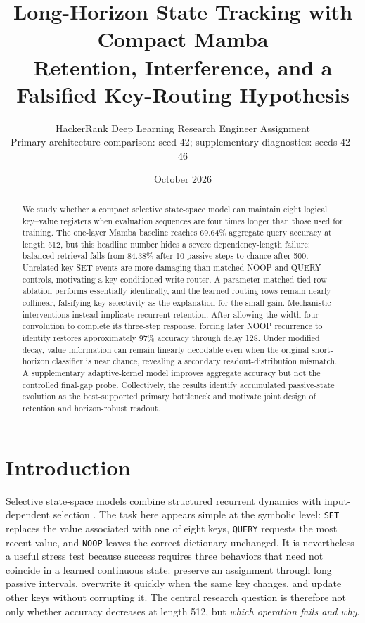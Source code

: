 \documentclass[10pt,a4paper]{article}
\title{\vspace{-1.8em}\textbf{Long-Horizon State Tracking with Compact Mamba}\\[-0.05em]
\large Retention, Interference, and a Falsified Key-Routing Hypothesis}
\author{HackerRank Deep Learning Research Engineer Assignment\\
\small Primary architecture comparison: seed 42; supplementary diagnostics: seeds 42--46}
\date{October 2026}
\newcommand{\SET}{\texttt{SET}}
\newcommand{\QUERY}{\texttt{QUERY}}
\newcommand{\NOOP}{\texttt{NOOP}}
\begin{document}
\maketitle
\vspace{-1.45em}
\fontsize{9.4pt}{10.9pt}\selectfont

\begin{abstract}\small
We study whether a compact selective state-space model can maintain eight logical key--value registers when evaluation sequences are four times longer than those used for training. The one-layer Mamba baseline reaches 69.64\% aggregate query accuracy at length 512, but this headline number hides a severe dependency-length failure: balanced retrieval falls from 84.38\% after 10 passive steps to chance after 500. Unrelated-key SET events are more damaging than matched NOOP and QUERY controls, motivating a key-conditioned write router. A parameter-matched tied-row ablation performs essentially identically, and the learned routing rows remain nearly collinear, falsifying key selectivity as the explanation for the small gain. Mechanistic interventions instead implicate recurrent retention. After allowing the width-four convolution to complete its three-step response, forcing later NOOP recurrence to identity restores approximately 97\% accuracy through delay 128. Under modified decay, value information can remain linearly decodable even when the original short-horizon classifier is near chance, revealing a secondary readout-distribution mismatch. A supplementary adaptive-kernel model improves aggregate accuracy but not the controlled final-gap probe. Collectively, the results identify accumulated passive-state evolution as the best-supported primary bottleneck and motivate joint design of retention and horizon-robust readout.
\end{abstract}

\section{Introduction}
Selective state-space models combine structured recurrent dynamics with input-dependent selection \cite{s4,mamba}. The task here appears simple at the symbolic level: \SET{} replaces the value associated with one of eight keys, \QUERY{} requests the most recent value, and \NOOP{} leaves the correct dictionary unchanged. It is nevertheless a useful stress test because success requires three behaviors that need not coincide in a learned continuous state: preserve an assignment through long passive intervals, overwrite it quickly when the same key changes, and update other keys without corrupting it. The central research question is therefore not only whether accuracy decreases at length 512, but \emph{which operation fails and why}.
\end{document}

